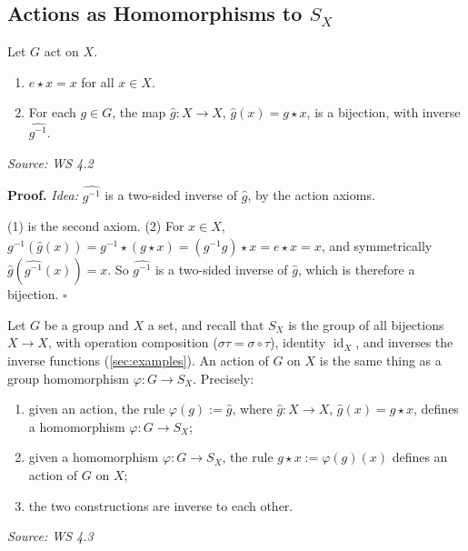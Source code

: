 \documentclass[11pt]{report}
\renewenvironment{proof}[1][Proof]{\noindent\textbf{#1.} }{\hfill$\square$\par\vspace{5pt}}
\newcommand{\srcline}[1]{\par\hfill{\footnotesize\textit{Source: #1}}}
\begin{document}
\subsection{\texorpdfstring{Actions as Homomorphisms to $S_X$}{Actions as Homomorphisms to S\_X}}

\begin{propbox}\label{prop:each-group-element-acts-bijectively}
Let $G$ act on $X$.
\begin{enumerate}
    \item $e \star x = x$ for all $x \in X$.
    \item For each $g \in G$, the map $\hat g: X \to X$, $\hat g(x) = g \star x$, is a bijection, with inverse $\widehat{g^{-1}}$.
\end{enumerate}
\srcline{WS 4.2}
\end{propbox}

\begin{proof}
\textit{Idea:} $\widehat{g^{-1}}$ is a two-sided inverse of $\hat g$, by the action axioms.\par
(1) is the second axiom. (2) For $x \in X$, $\widehat{g^{-1}}(\hat g(x)) = g^{-1} \star (g \star x) = (g^{-1}g) \star x = e \star x = x$, and symmetrically $\hat g(\widehat{g^{-1}}(x)) = x$. So $\widehat{g^{-1}}$ is a two-sided inverse of $\hat g$, which is therefore a bijection.
\end{proof}

\begin{thmbox}\label{thm:actions-homomorphisms-sx}
Let $G$ be a group and $X$ a set, and recall that $S_X$ is the group of all bijections $X \to X$, with operation composition ($\sigma\tau = \sigma \circ \tau$), identity $\operatorname{id}_X$, and inverses the inverse functions (\ref{sec:examples}). An action of $G$ on $X$ is the same thing as a group homomorphism $\varphi: G \to S_X$. Precisely:
\begin{enumerate}
    \item given an action, the rule $\varphi(g) := \hat g$, where $\hat g: X \to X$, $\hat g(x) = g \star x$, defines a homomorphism $\varphi: G \to S_X$;
    \item given a homomorphism $\varphi: G \to S_X$, the rule $g \star x := \varphi(g)(x)$ defines an action of $G$ on $X$;
    \item the two constructions are inverse to each other.
\end{enumerate}
\srcline{WS 4.3}
\end{thmbox}
\end{document}
